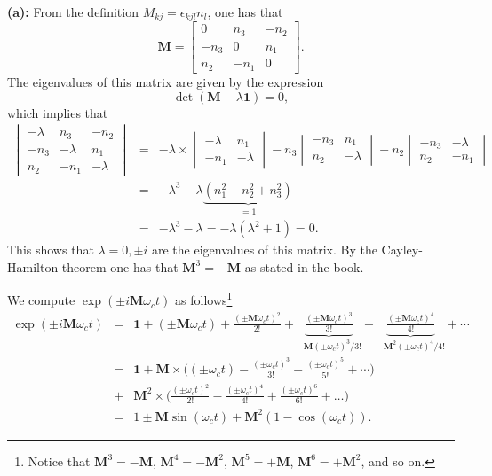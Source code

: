
\textbf{(a):} From the definition $M_{kj} = \epsilon_{kjl} n_l$, one has that
\begin{equation}
\textbf{M}= \begin{bmatrix}
0 & n_3 & -n_2\\
-n_3 & 0 & n_1 \\
n_2 & -n_1 & 0 
\end{bmatrix}.
\end{equation}
The eigenvalues of this matrix are given by the expression
\begin{equation}
\det(\textbf{M}-\lambda \textbf{1})= 0,
\end{equation}
which implies that
\begin{eqnarray} \begin{vmatrix}
-\lambda & n_3 & -n_2\\
-n_3 & -\lambda & n_1 \\
n_2 & -n_1 & -\lambda 
\end{vmatrix} &=& -\lambda \times \begin{vmatrix}
-\lambda & n_1 \\
-n_1 & -\lambda \end{vmatrix} - n_3 \begin{vmatrix}
-n_3 & n_1 \\
n_2 & -\lambda 
\end{vmatrix} - n_2 \begin{vmatrix}
-n_3 & -\lambda \\
n_2 & -n_1 
\end{vmatrix} \\
&=& -\lambda^3 -\lambda\underbrace{(n_1^2 + n_2 ^ 2 + n_3^2)}_{=1} \\&=&  -\lambda^3 - \lambda = -\lambda(\lambda^2+1) =  0.
\end{eqnarray}
This shows that $\lambda = 0, \pm i$ are the eigenvalues of this matrix. By the Cayley-Hamilton theorem one has that $\textbf{M}^3=-\textbf{M}$ as stated in the book.

We compute $\exp(\pm i \textbf{M} \omega_c t)$ as follows\footnote{Notice that $\textbf{M}^3 = -\textbf{M}$, $\textbf{M}^4 = -\textbf{M}^2$, $\textbf{M}^5 = +\textbf{M}$, $\textbf{M}^6 = +\textbf{M}^2$, and so on.}
\begin{eqnarray}
\exp(\pm i \textbf{M} \omega_c t) &=& \textbf{1} + (\pm \textbf{M} \omega_c t) + \frac{(\pm \textbf{M} \omega_c t)^2}{2!} + \underbrace{\frac{(\pm \textbf{M} \omega_c t)^3}{3!}}_{-\textbf{M} (\pm \omega_c t)^3/3!} +  \underbrace{\frac{(\pm \textbf{M} \omega_c t)^4}{4!}}_{-\textbf{M}^2 (\pm \omega_c t)^4/4!} + \cdots \nonumber \\
&=& \textbf{1} + \textbf{M} \times \bigg((\pm \omega_c t) - \frac{(\pm \omega_c t)^3}{3!} + \frac{(\pm \omega_c t)^5}{5!} + \cdots \bigg) \nonumber \\
&+& \textbf{M}^2\times  \bigg( \frac{(\pm \omega_c t)^2}{2!} -  \frac{(\pm \omega_c t)^4}{4!} +  \frac{(\pm \omega_c t)^6}{6!} + \ldots \bigg) \nonumber \\
&=& \boxed{1 \pm \textbf{M} \sin(\omega_c t) + \textbf{M}^2 (1-\cos(\omega_c t))}.
\end{eqnarray}

